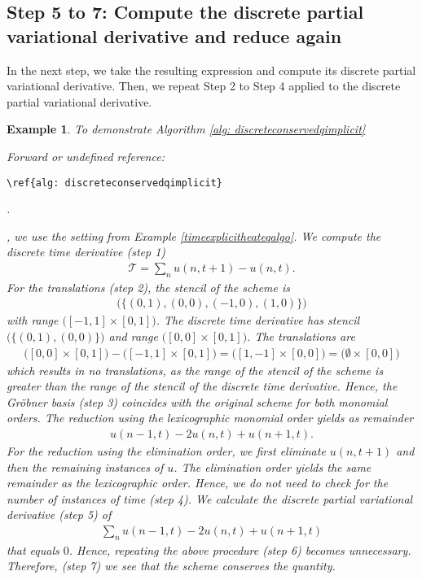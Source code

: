 \documentclass[sigconf,twocolumn]{acmart}
\newcommand{\1}{{\chi}}
\numberwithin{equation}{section}
\theoremstyle{thmlemcorr}
\numberwithin{theorem}{section}
\theoremstyle{thmlemcorr*}
\theoremstyle{defi}
\theoremstyle{remexample}
\newtheorem{example}[theorem]{Example}
\theoremstyle{ass}
\begin{document}
\subsection*{Step 5 to 7: Compute the discrete partial variational derivative and reduce again}
	In the next step, we take the resulting expression and compute its discrete partial variational derivative. Then, we repeat Step 2 to Step 4 applied to the discrete partial variational derivative.
	\begin{example}
		\label{heateqalgoimplicit}
		To demonstrate Algorithm \ref{alg: discreteconservedqimplicit}
 {\color{red} Forward or undefined reference: \begin{verbatim}\ref{alg: discreteconservedqimplicit}\end{verbatim}.}
, we use the setting from Example \ref{timeexplicitheateqalgo}.
		We compute the discrete time derivative (step 1)
		\begin{gather*}
			\mathcal{T}=\sum_n u(n,t+1)-u(n,t).
		\end{gather*}
		For the translations (step 2), the stencil of the scheme is
		\begin{gather*}
			\Big(\big\{(0,1),(0,0),(-1,0),(1,0)\big\}\Big)
		\end{gather*}
	with range \(\Big([-1,1]\times[0,1]\Big)\).
	The discrete time derivative has stencil \(\Big(\big\{(0,1),(0,0)\big\}\Big)\)
	and range \(\Big([0,0]\times[0,1]\Big)\).
	The translations are
	\small
	\begin{gather*}
	\Big([0,0]\times[0,1]\Big)-\Big([-1,1]\times[0,1]\Big)=\Big([1,-1]\times[0,0]\Big)=\Big(\emptyset\times[0,0]\Big)
	\end{gather*}
	\normalsize
	which results in no translations, as the range of the stencil of the scheme is greater than the range of the stencil of the discrete time derivative.
	Hence, the Gr{\"o}bner basis (step 3) coincides with the original scheme for both monomial orders.
	The reduction using the lexicographic monomial order yields as remainder
	\begin{gather*}
		u(n-1,t)-2u(n,t)+u(n+1,t).
	\end{gather*}
	For the reduction using the elimination order, we first eliminate \(u(n,t+1)\) and then the remaining instances of \(u\).
	The elimination order yields the same remainder as the lexicographic order. Hence, we do not need to check for the number of instances of time (step 4).
	We calculate the discrete partial variational derivative (step 5) of
	\begin{gather*}
		\sum_nu(n-1,t)-2u(n,t)+u(n+1,t)
	\end{gather*}
	that equals \(0\).
	Hence, repeating the above procedure (step 6) becomes unnecessary.
	Therefore, (step 7) we see that the scheme conserves the quantity.
	\end{example}
\end{document}
